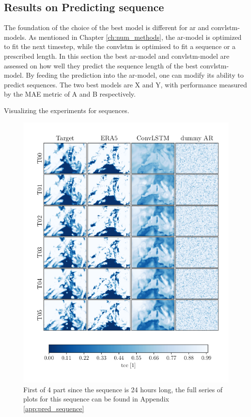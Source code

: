 \subsection{Results on Predicting sequence}
The foundation of the choice of the best model is different for \acrshort{ar} and \acrshort{convlstm}-models. As mentioned in Chapter \ref{ch:num_methods}, the \acrshort{ar}-model is optimized to fit the next timestep, while the \acrshort{convlstm} is optimised to fit a sequence or a prescribed length. In this section the best \acrshort{ar}-model and \acrshort{convlstm}-model are assessed on how well they predict the sequence length of the best \acrshort{convlstm}-model. By feeding the prediction into the \acrshort{ar}-model, one can modify its ability to predict sequences. The two best models are X and Y, with performance measured by the MAE metric of A and B respectively. 

Visualizing the experiments for sequences.
\begin{figure}[ht]
    \centering
    \includegraphics[sale=0.1]{python_figs/comparting_seq_part_1_of4.png}
    \caption{First of 4 part since the sequence is 24 hours long, the full series of plots for this sequence can be found in Appendix \ref{app:pred_sequence} }
    \label{fig:target_predict_era5_horizontal}
\end{figure}

